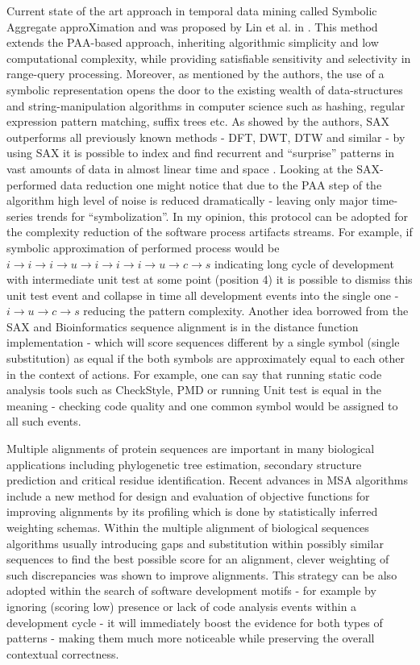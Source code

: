 \documentclass{sig-alternate}
\begin{document}
Current state of the art approach in temporal data mining called Symbolic Aggregate approXimation and was proposed by Lin et al. in \cite{citeulike:2821475}. This method extends the PAA-based approach, inheriting algorithmic simplicity and low computational complexity, while providing satisfiable sensitivity and selectivity in range-query processing. Moreover, as mentioned by the authors, the use of a symbolic representation opens the door to the existing wealth of data-structures and string-manipulation algorithms in computer science such as hashing, regular expression pattern matching, suffix trees etc. As showed by the authors, SAX outperforms all previously known methods - DFT, DWT, DTW and similar - by using SAX it is possible to index and find recurrent and ``surprise'' patterns in vast amounts of data in almost linear time and space \cite{citeulike:1630245} \cite{citeulike:3025877} \cite{citeulike:3000416}. Looking at the SAX-performed data reduction one might notice that due to the PAA step of the algorithm high level of noise is reduced dramatically - leaving only major time-series trends for ``symbolization''. In my opinion, this protocol can be adopted for the complexity reduction of the software process artifacts streams. For example, if symbolic approximation of performed process would be $i \rightarrow i \rightarrow i \rightarrow u \rightarrow i \rightarrow i \rightarrow i \rightarrow u \rightarrow c \rightarrow s $ indicating long cycle of development with intermediate unit test at some point (position 4) it is possible to dismiss this unit test event and collapse in time all development events into the single one - $i \rightarrow u \rightarrow c \rightarrow s $ reducing the pattern complexity. Another idea borrowed from the SAX and Bioinformatics sequence alignment is in the distance function implementation - which will score sequences different by a single symbol (single substitution) as equal if the both symbols are approximately equal to each other in the context of actions. For example, one can say that running static code analysis tools such as CheckStyle, PMD or running Unit test is equal in the meaning - checking code quality and one common symbol would be assigned to all such events.

Multiple alignments of protein sequences are important in many biological applications including phylogenetic tree estimation, secondary structure prediction and critical residue identification. Recent advances in MSA algorithms \cite{citeulike:692} include a new method for design and evaluation of objective functions for improving alignments by its profiling which is done by statistically inferred weighting schemas. Within the multiple alignment of biological sequences algorithms usually introducing gaps and substitution within possibly similar sequences to find the best possible score for an alignment, clever weighting of such discrepancies was shown to improve alignments. This strategy can be also adopted within the search of software development motifs - for example by ignoring (scoring low) presence or lack of code analysis events within a development cycle - it will immediately boost the evidence for both types of patterns - making them much more noticeable while preserving the 	overall contextual correctness.
\end{document}
